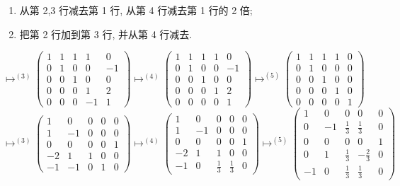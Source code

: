 \begin{enumerate}
\item[(1)] 从第 2,3 行减去第 1 行, 从第 4 行减去第 1 行的 2 倍;
\item[(2)] 把第 2 行加到第 3 行, 并从第 4 行减去.
\end{enumerate}
\[
\longmapsto^{(3)} \begin{pmatrix} 1 & 1 & 1 & 1 & 0 \\ 0 & 1 & 0 & 0 & -1 \\ 0 & 0 & 1 & 0 & 0 \\ 0 & 0 & 0 & 1 & 2 \\ 0 & 0 & 0 & -1 & 1 \end{pmatrix}
\longmapsto^{(4)} \begin{pmatrix} 1 & 1 & 1 & 1 & 0 \\ 0 & 1 & 0 & 0 & -1 \\ 0 & 0 & 1 & 0 & 0 \\ 0 & 0 & 0 & 1 & 2 \\ 0 & 0 & 0 & 0 & 1 \end{pmatrix}
\longmapsto^{(5)} \begin{pmatrix} 1 & 1 & 1 & 1 & 0 \\ 0 & 1 & 0 & 0 & 0 \\ 0 & 0 & 1 & 0 & 0 \\ 0 & 0 & 0 & 1 & 0 \\ 0 & 0 & 0 & 0 & 1 \end{pmatrix}
\]
\[
\longmapsto^{(3)} \begin{pmatrix} 1 & 0 & 0 & 0 & 0 \\ 1 & -1 & 0 & 0 & 0 \\ 0 & 0 & 0 & 0 & 1 \\ -2 & 1 & 1 & 0 & 0 \\ -1 & -1 & 0 & 1 & 0 \end{pmatrix}
\longmapsto^{(4)} \begin{pmatrix} 1 & 0 & 0 & 0 & 0 \\ 1 & -1 & 0 & 0 & 0 \\ 0 & 0 & 0 & 0 & 1 \\ -2 & 1 & 1 & 0 & 0 \\ -1 & 0 & \frac{1}{3} & \frac{1}{3} & 0 \end{pmatrix}
\longmapsto^{(5)} \begin{pmatrix} 1 & 0 & 0 & 0 & 0 \\ 0 & -1 & \frac{1}{3} & \frac{1}{3} & 0 \\ 0 & 0 & 0 & 0 & 1 \\ 0 & 1 & \frac{1}{3} & -\frac{2}{3} & 0 \\ -1 & 0 & \frac{1}{3} & \frac{1}{3} & 0 \end{pmatrix}
\]
